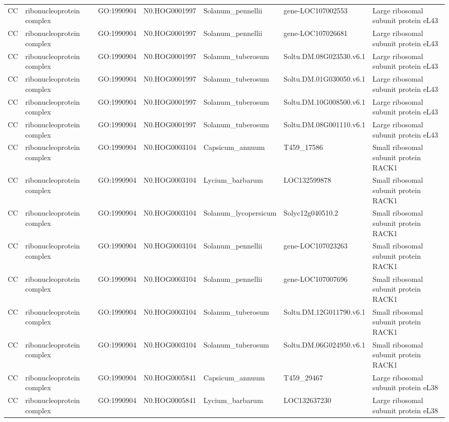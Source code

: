 \begin{table}
\begin{tabular}[t]{lllllll}
CC & ribonucleoprotein complex & GO:1990904 & N0.HOG0001997 & Solanum\_pennellii & gene-LOC107002553 & Large ribosomal subunit protein eL43\\
CC & ribonucleoprotein complex & GO:1990904 & N0.HOG0001997 & Solanum\_pennellii & gene-LOC107026681 & Large ribosomal subunit protein eL43\\
CC & ribonucleoprotein complex & GO:1990904 & N0.HOG0001997 & Solanum\_tuberosum & Soltu.DM.08G023530.v6.1 & Large ribosomal subunit protein eL43\\
CC & ribonucleoprotein complex & GO:1990904 & N0.HOG0001997 & Solanum\_tuberosum & Soltu.DM.01G030050.v6.1 & Large ribosomal subunit protein eL43\\
CC & ribonucleoprotein complex & GO:1990904 & N0.HOG0001997 & Solanum\_tuberosum & Soltu.DM.10G008500.v6.1 & Large ribosomal subunit protein eL43\\
CC & ribonucleoprotein complex & GO:1990904 & N0.HOG0001997 & Solanum\_tuberosum & Soltu.DM.08G001110.v6.1 & Large ribosomal subunit protein eL43\\
CC & ribonucleoprotein complex & GO:1990904 & N0.HOG0003104 & Capsicum\_annuum & T459\_17586 & Small ribosomal subunit protein RACK1\\
CC & ribonucleoprotein complex & GO:1990904 & N0.HOG0003104 & Lycium\_barbarum & LOC132599878 & Small ribosomal subunit protein RACK1\\
CC & ribonucleoprotein complex & GO:1990904 & N0.HOG0003104 & Solanum\_lycopersicum & Solyc12g040510.2 & Small ribosomal subunit protein RACK1\\
CC & ribonucleoprotein complex & GO:1990904 & N0.HOG0003104 & Solanum\_pennellii & gene-LOC107023263 & Small ribosomal subunit protein RACK1\\
CC & ribonucleoprotein complex & GO:1990904 & N0.HOG0003104 & Solanum\_pennellii & gene-LOC107007696 & Small ribosomal subunit protein RACK1\\
CC & ribonucleoprotein complex & GO:1990904 & N0.HOG0003104 & Solanum\_tuberosum & Soltu.DM.12G011790.v6.1 & Small ribosomal subunit protein RACK1\\
CC & ribonucleoprotein complex & GO:1990904 & N0.HOG0003104 & Solanum\_tuberosum & Soltu.DM.06G024950.v6.1 & Small ribosomal subunit protein RACK1\\
CC & ribonucleoprotein complex & GO:1990904 & N0.HOG0005841 & Capsicum\_annuum & T459\_29467 & Large ribosomal subunit protein eL38\\
CC & ribonucleoprotein complex & GO:1990904 & N0.HOG0005841 & Lycium\_barbarum & LOC132637230 & Large ribosomal subunit protein eL38\\

\end{tabular}
\end{table}
